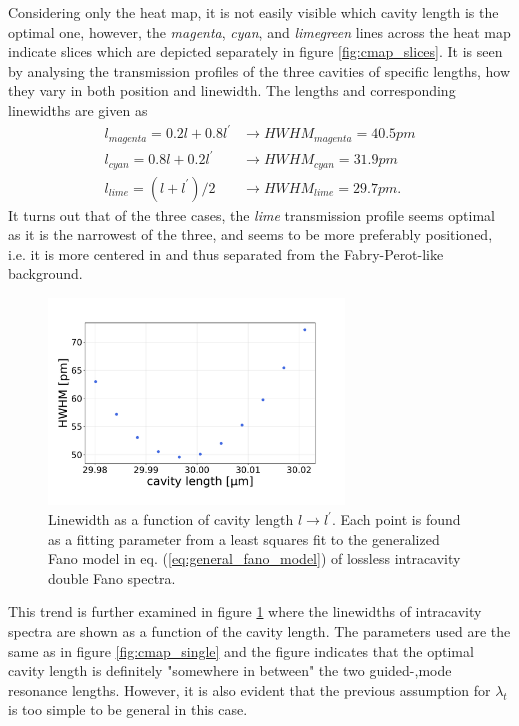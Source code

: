 Considering only the heat map, it is not easily visible which cavity length is the optimal one, however, the \emph{magenta}, \emph{cyan}, and \emph{limegreen} lines across the heat map indicate slices which are depicted separately in figure \ref{fig:cmap_slices}. It is seen by analysing the transmission profiles of the three cavities of specific lengths, how they vary in both position and linewidth. The lengths and corresponding linewidths are given as
\begin{equation}
    \begin{split}
        l_{magenta} = 0.2 l + 0.8 l^{\prime} &\rightarrow HWHM_{magenta} = 40.5pm\\ l_{cyan} = 0.8 l + 0.2 l^{\prime} &\rightarrow HWHM_{cyan} = 31.9pm\\ l_{lime} = (l + l^{\prime})/2 &\rightarrow HWHM_{lime} = 29.7pm.
    \end{split}
\end{equation}
It turns out that of the three cases, the \emph{lime} transmission profile seems optimal as it is the narrowest of the three, and seems to be more preferably positioned, i.e. it is more centered in and thus separated from the Fabry-Perot-like background. 

\begin{figure}[h!]
    \centering
    \includegraphics[width=0.7\textwidth]{figures/lw_vs_length_intracavity.pdf}
    \caption{Linewidth as a function of cavity length $l \rightarrow l^{\prime}$. Each point is found as a fitting parameter from a least squares fit to the generalized Fano model in eq. (\ref{eq:general_fano_model}) of lossless intracavity double Fano spectra.}
    \label{fig:lw_vs_l_scan}
\end{figure}

This trend is further examined in figure \ref{fig:lw_vs_l_scan} where the linewidths of intracavity spectra are shown as a function of the cavity length. The parameters used are the same as in figure \ref{fig:cmap_single} and the figure indicates that the optimal cavity length is definitely "somewhere in between" the two guided-,mode resonance lengths. However, it is also evident that the previous assumption for $\lambda_t$ is too simple to be general in this case. 

